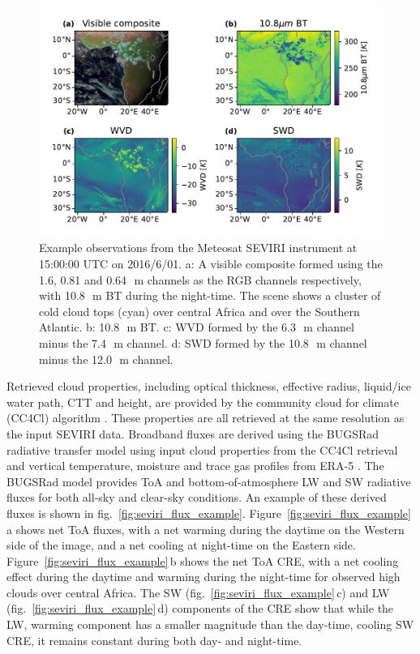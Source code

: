 \documentclass[acp, manuscript]{copernicus}
\begin{document}
\begin{figure}[tp]
    \includegraphics[width=12cm]{figures/fig01.pdf}
    \caption[
    Example observations from the Meteosat SEVIRI instrument at 15:00:00 UTC on 2016/6/01
    ]{
    Example observations from the Meteosat SEVIRI instrument at 15:00:00 UTC on 2016/6/01. a: A visible composite formed using the 1.6, 0.81 and 0.64\,\unit{\mu m} channels as the RGB channels respectively, with 10.8\,\unit{\mu m} BT during the night-time. The scene shows a cluster of cold cloud tops (cyan) over central Africa and over the Southern Atlantic. b: 10.8\,\unit{\mu m} BT. c: WVD formed by the 6.3\,\unit{\mu m} channel minus the 7.4\,\unit{\mu m} channel. d: SWD formed by the 10.8\,\unit{\mu m} channel minus the 12.0\,\unit{\mu m} channel.
    }
    \label{fig:seviri_obs_example}
\end{figure}


Retrieved cloud properties, including optical thickness, effective radius, liquid/ice water path, CTT and height, are provided by the community cloud for climate (CC4Cl) algorithm \citep{sus_community_2018, mcgarragh_community_2018}. 
These properties are all retrieved at the same resolution as the input SEVIRI data. Broadband fluxes are derived using the BUGSRad radiative transfer model \citep{stephens_parameterization_2001} using input cloud properties from the CC4Cl retrieval and vertical temperature, moisture and trace gas profiles from ERA-5 \citep{hersbach_era5_2020}. 
The BUGSRad model provides ToA and bottom-of-atmosphere LW and SW radiative fluxes for both all-sky and clear-sky conditions. An example of these derived fluxes is shown in fig.~\ref{fig:seviri_flux_example}. 
Figure~\ref{fig:seviri_flux_example}\,a shows net ToA fluxes, with a net warming during the daytime on the Western side of the image, and a net cooling at night-time on the Eastern side. 
Figure~\ref{fig:seviri_flux_example}\,b shows the net ToA CRE, with a net cooling effect during the daytime and warming during the night-time for observed high clouds over central Africa. The SW (fig.~\ref{fig:seviri_flux_example}\,c) and LW (fig.~\ref{fig:seviri_flux_example}\,d) components of the CRE show that while the LW,
warming component has a smaller magnitude than the day-time, cooling SW CRE, it remains constant during both day- and night-time.
\end{document}
